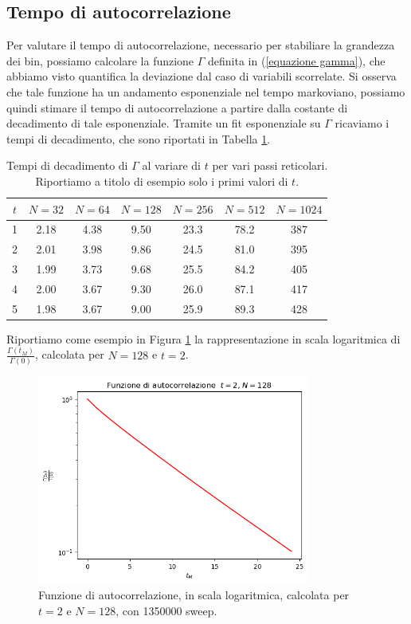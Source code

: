 \documentclass{article}
\begin{document}
\subsection{Tempo di autocorrelazione}

Per valutare il tempo di autocorrelazione, necessario per stabiliare la grandezza dei bin, possiamo calcolare la funzione $\Gamma$ definita in (\ref{equazione gamma}), che abbiamo visto quantifica la deviazione dal caso di variabili scorrelate. Si osserva che tale funzione ha un andamento esponenziale nel tempo markoviano, possiamo quindi stimare il tempo di autocorrelazione a partire dalla costante di decadimento di tale esponenziale. Tramite un fit esponenziale su $\Gamma$ ricaviamo i tempi di decadimento, che sono riportati in Tabella \ref{tabella autocorrelazione}.
\begin{table}[h]
    \centering
    \begin{tabular}{||c c c c c c c||} 
     \hline
     $t$ & $N=32$ & $N=64$ & $N=128$ & $N=256$ & $N=512$ & $N=1024$ \\ [0.5ex] 
     \hline\hline
     1 & 2.18 & 4.38 & 9.50 & 23.3 & 78.2 & 387\\
     2 & 2.01 & 3.98 & 9.86 & 24.5 & 81.0 & 395\\
     3 & 1.99 & 3.73 & 9.68 & 25.5 & 84.2 & 405\\
     4 & 2.00 & 3.67 & 9.30 & 26.0 & 87.1 & 417\\
     5 & 1.98 & 3.67 & 9.00 & 25.9 & 89.3 & 428\\[1ex] 
     \hline
    \end{tabular}
    \caption{Tempi di decadimento di $\Gamma$ al variare di $t$ per vari passi reticolari. Riportiamo a titolo di esempio solo i primi valori di $t$.}
    \label{tabella autocorrelazione}
\end{table}

Riportiamo come esempio in Figura \ref{grafico gamma non binnata} la rappresentazione in scala logaritmica di $\frac{\Gamma(t_M)}{\Gamma(0)}$, calcolata per $N=128$ e $t=2$. 
\begin{figure}[h]
    \centering
    \includegraphics[width=0.8\textwidth]{images/gamma_t2_N128.png}
    \caption{Funzione di autocorrelazione, in scala logaritmica, calcolata per $t=2$ e $N=128$, con 1350000 sweep.}
    \label{grafico gamma non binnata}
\end{figure}
\end{document}
